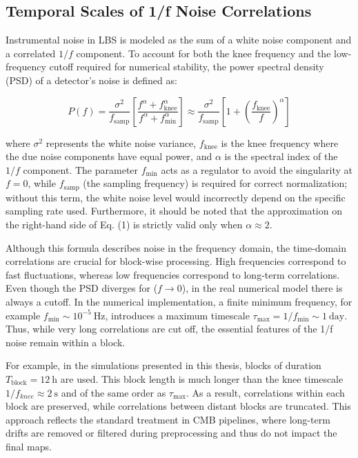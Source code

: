 \subsection{Temporal Scales of 1/f Noise Correlations}

Instrumental noise in LBS is modeled as the sum of a white noise component and a correlated $1/f$ component. To account for both the knee frequency and the low-frequency cutoff required for numerical stability, the power spectral density (PSD) of a detector's noise is defined as:

\begin{equation}
    P(f) = \frac{\sigma^{2}}{f_{\text{samp}}} \left[ \frac{f^\alpha + f_{\text{knee}}^\alpha}{f^\alpha + f_{\text{min}}^\alpha} \right] \approx \frac{\sigma^{2}}{f_{\text{samp}}} \left[ 1 + \left( \frac{f_{\text{knee}}}{f} \right)^\alpha \right]
\end{equation}

where $\sigma^2$ represents the white noise variance, $f_{\text{knee}}$ is the knee frequency where the due noise components have equal power, and $\alpha$ is the spectral index of the $1/f$ component. The parameter $f_{\text{min}}$ acts as a regulator to avoid the singularity at $f = 0$, while $f_{\text{samp}}$ (the sampling frequency) is required for correct normalization; without this term, the white noise level would incorrectly depend on the specific sampling rate used. Furthermore, it should be noted that the approximation on the right-hand side of Eq. (1) is strictly valid only when $\alpha \approx 2$.


Although this formula describes noise in the frequency domain, the time-domain correlations are crucial for block-wise processing. High frequencies correspond to fast fluctuations, whereas low frequencies correspond to long-term correlations. Even though the PSD diverges for ($f \to 0$), in the real numerical model there is always a cutoff. In the numerical implementation, a finite minimum frequency, for example \(f_\text{min} \sim 10^{-5} \ \text{Hz}\), introduces a maximum timescale \(\tau_\text{max} = 1/f_\text{min} \sim 1 \ \text{day}\). Thus, while very long correlations are cut off, the essential features of the 1/f noise remain within a block.

For example, in the simulations presented in this thesis, blocks of duration \(T_\text{block} = 12 \ \text{h}\) are used. This block length is much longer than the knee timescale \(1/f_{knee} \approx 2 \ \text{s}\) and of the same order as \(\tau_\text{max}\). As a result, correlations within each block are preserved, while correlations between distant blocks are truncated. This approach reflects the standard treatment in CMB pipelines, where long-term drifts are removed or filtered during preprocessing and thus do not impact the final maps.



